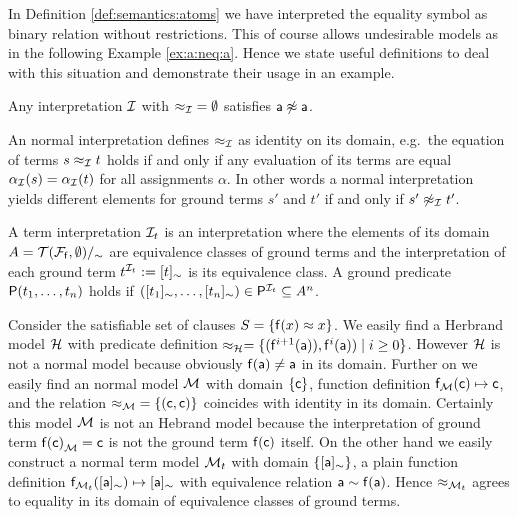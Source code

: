 In Definition \ref{def:semantics:atoms} we have interpreted the equality symbol as binary relation without restrictions.
This of course allows undesirable models as in the following Example \ref{ex:a:neq:a}.
Hence we state useful definitions to deal with this situation and demonstrate their usage in an example.

\begin{example}
	\label{ex:a:neq:a}
	Any interpretation $\mathcal{I}$
	with ${\approx_{\mathcal{I}}} = \emptyset$ satisfies $\mathsf{a}\not\approx\mathsf{a}$.
\end{example}

\begin{definition}\label{def:normal:interpreation}
	An {\myem normal} interpretation defines $\approx_{\mathcal{I}}$ as identity on its domain,
	e.g.~the equation of terms $s \approx_{\mathcal{I}} t$ holds if and only
	if any evaluation of its terms are equal $\alpha_{\mathcal{I}}(s) = \alpha_{\mathcal{I}}(t)$
	for all assignments $\alpha$.
	In other words a normal interpretation yields different elements
	for ground terms $s'$ and $t'$ if and only if $s'\not\approx_{\mathcal{I}} t'$.
\end{definition}

\begin{definition}
	A {\myem term interpretation}
	$\mathcal{I}_t$
	is an interpretation
	where the elements of its domain $A = {\mathcal{T}(\mathcal{F}_{\mathsf{f}},\emptyset)}/_\sim$
	are equivalence classes of ground terms
	and the interpretation of each ground term $t^{\mathcal{I}_t} := [t]_\sim$ is its equivalence class.
	A ground predicate $\mathsf{P}(t_1,\ldots,t_n)$ holds if
	$([t_1]_\sim,\ldots,[t_n]_\sim) \in \mathsf{P}^{\mathcal{I}_t} \subseteq A^n$.
\end{definition}


\begin{example}
	Consider the satisfiable set of clauses $S = \{ \mathsf{f}(x) \approx x \}$.
	We easily find a Herbrand model $\mathcal{H}$ with
	predicate definition $\approx_{\mathcal{H}} = \{ (\mathsf{f}^{i+1}(\mathsf{a})), \mathsf{f}^{i}(\mathsf{a})) \mid i\geq 0  \} $.
	However $\mathcal{H}$ is not a normal model because obviously $\mathsf{f}(\mathsf{a})\neq\mathsf{a}$ in its domain.
	Further on we easily find an normal model $\mathcal{M}$
	with domain $\{ \mathsf{c} \}$, function definition $\mathsf{f}_{\mathcal{M}}(\mathsf{c}) \mapsto \mathsf{c}$,
	and the relation ${\approx_{\mathcal{M}}} = \{ (\mathsf{c},\mathsf{c})\}$ coincides with identity in its domain.
	Certainly this model $\mathcal{M}$ is not an Hebrand model
	because the interpretation of ground term ${\mathsf{f}(\mathsf{c})}_{\mathcal{M}} = \mathsf{c}$ is not the ground term $\mathsf{f}(\mathsf{c})$ itself.
	On the other hand we easily construct a normal term model $\mathcal{M}_t$ with domain $\{ [\mathsf{a}]_\sim\}$,
	a plain function definition
	$\mathsf{f}_{\mathcal{M}_t}([\mathsf{a}]_\sim) \mapsto [\mathsf{a}]_\sim$
	with equivalence relation
	$\mathsf{a} \sim \mathsf{f}(\mathsf{a})$.
	Hence $\approx_{\mathcal{M}_t}$ agrees to equality in its domain of equivalence classes of ground terms.
\end{example}

